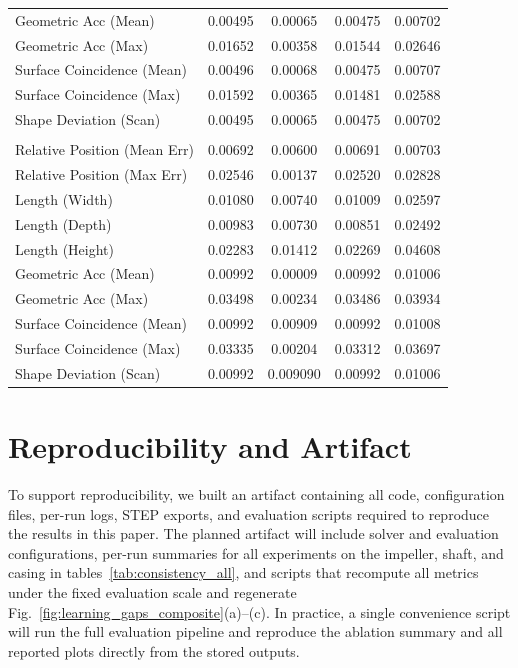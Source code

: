\documentclass{ieeeaccess}
\begin{document}
\begin{table}[t]
\begin{tabular}{
      >{\raggedright\arraybackslash}p{}
      S S S S
  }
    Geometric Acc (Mean)              & 0.00495 & 0.00065 & 0.00475 & 0.00702 \\
    Geometric Acc (Max)               & 0.01652 & 0.00358 & 0.01544 & 0.02646 \\
    Surface Coincidence (Mean)        & 0.00496 & 0.00068 & 0.00475 & 0.00707 \\
    Surface Coincidence (Max)         & 0.01592 & 0.00365 & 0.01481 & 0.02588 \\
    Shape Deviation (Scan)            & 0.00495 & 0.00065 & 0.00475 & 0.00702 \\
    \midrule
     \\
    Relative Position (Mean Err) & 0.00692 & 0.00600 & 0.00691 & 0.00703 \\
    Relative Position (Max Err)  & 0.02546 & 0.00137 & 0.02520 & 0.02828 \\
    Length (Width)               & 0.01080 & 0.00740 & 0.01009 & 0.02597 \\
    Length (Depth)               & 0.00983 & 0.00730 & 0.00851 & 0.02492 \\
    Length (Height)              & 0.02283 & 0.01412 & 0.02269 & 0.04608 \\
    Geometric Acc (Mean)         & 0.00992 & 0.00009 & 0.00992 & 0.01006 \\
    Geometric Acc (Max)          & 0.03498 & 0.00234 & 0.03486 & 0.03934 \\
    Surface Coincidence (Mean)   & 0.00992 & 0.00909 & 0.00992 & 0.01008 \\
    Surface Coincidence (Max)    & 0.03335 & 0.00204 & 0.03312 & 0.03697 \\
    Shape Deviation (Scan)       & 0.00992 & 0.009090 & 0.00992 & 0.01006 \\
    \bottomrule
  \end{tabular}
\end{table}

\section{Reproducibility and Artifact}
\label{sec:artifact}
To support reproducibility, we built an artifact containing all code, 
configuration files, per-run logs, STEP exports, and evaluation scripts required 
to reproduce the results in this paper. The planned artifact will include solver 
and evaluation configurations, per-run summaries for all experiments on the 
impeller, shaft, and casing in tables~\ref{tab:consistency_all}, and scripts that recompute all metrics 
under the fixed evaluation scale and regenerate Fig.~\ref{fig:learning_gaps_composite}(a)–(c). In practice, a 
single convenience script will run the full evaluation pipeline and reproduce the 
ablation summary and all reported plots directly from the stored outputs.
\end{document}

